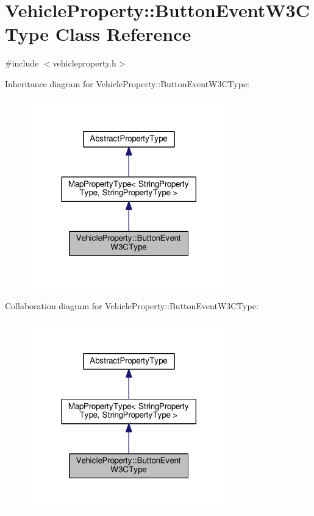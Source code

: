 \hypertarget{classVehicleProperty_1_1ButtonEventW3CType}{\section{Vehicle\+Property\+:\+:Button\+Event\+W3\+C\+Type Class Reference}
\label{classVehicleProperty_1_1ButtonEventW3CType}
}


{\ttfamily \#include $<$vehicleproperty.\+h$>$}



Inheritance diagram for Vehicle\+Property\+:\+:Button\+Event\+W3\+C\+Type\+:\nopagebreak
\begin{figure}[H]
\begin{center}
\leavevmode
\includegraphics[width=245pt]{classVehicleProperty_1_1ButtonEventW3CType__inherit__graph}
\end{center}
\end{figure}


Collaboration diagram for Vehicle\+Property\+:\+:Button\+Event\+W3\+C\+Type\+:\nopagebreak
\begin{figure}[H]
\begin{center}
\leavevmode
\includegraphics[width=245pt]{classVehicleProperty_1_1ButtonEventW3CType__coll__graph}
\end{center}
\end{figure}
